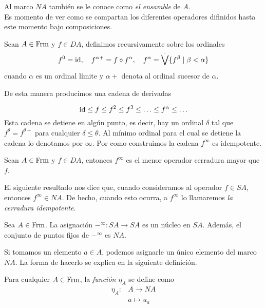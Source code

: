 Al marco $NA$ también se le conoce como \emph{el ensamble} de $A$.\\

Es momento de ver como se compartan los diferentes operadores difinidos hasta este momento bajo composiciones.

\begin{dfn}
Sean $A\in \mathrm{Frm}$ y $f\in DA$, definimos recursivamente sobre los ordinales 
\[
f^0=\mathrm{id}, \quad f^{\alpha +}=f\circ f^\alpha,\quad f^\alpha=\dot{\bigvee}\{f^\beta\mid \beta< \alpha\}
\]
cuando $\alpha$ es un ordinal límite y $\alpha +$ denota al ordinal sucesor de $\alpha$.
\end{dfn}

De esta manera producimos una cadena de derivadas 

\[
\mathrm{id}\leq f\leq f^2\leq f^3\leq\ldots \leq f^\alpha\leq \ldots
\]
Esta cadena se detiene en algún punto, es decir, hay un ordinal $\delta$ tal que $f^\theta=f^{\theta +}$ para cualquier $\delta\leq \theta$. Al mínimo ordinal para el cual se detiene la cadena lo denotamos por $\infty$. Por como construimos la cadena $f^\infty$ es idempotente.

\begin{lem}\label{finfinito}
Sean $A\in \mathrm{Frm}$ y $f\in DA$, entonces $f^\infty$ es el menor operador cerradura mayor que $f$.
\end{lem}

El siguiente resultado nos dice que, cuando consideramos al operador $f\in SA$, entonces $f^\infty\in NA$. De hecho, cuando esto ocurra, a $f^\infty$ lo llamaremos \emph{la cerradura idempotente}.\\

\begin{thm}\label{Cerraduraidempotente}
Sea $A\in \mathrm{Frm}$. La asignación $-^\infty\colon SA\to SA$ es un núcleo en $SA$. Además, el conjunto de puntos fijos de $-^\infty$ es $NA$.
\end{thm}

Si tomamos un elemento $a\in A$, podemos asignarle un único elemento del marco $NA$. La forma de hacerlo se explica en la siguiente definición. 

\begin{dfn}\label{Morfismoeta}
Para cualquier $A\in \mathrm{Frm}$,  la \emph{función $\eta_A$} se define como  
\begin{equation*}
\begin{split}
\eta_A\colon & A\to NA\\
& a\mapsto u_a
\end{split}
\end{equation*}
\end{dfn}

